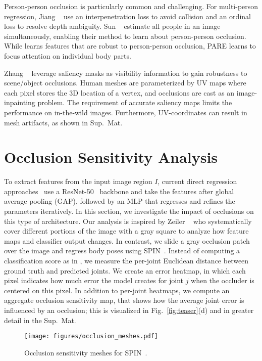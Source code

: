\documentclass[10pt,twocolumn,letterpaper,usenames,dvipsnames]{article}
\newcommand{\methodname}{PARE\xspace}
\newcommand{\figref}[1]{Fig.~\ref{#1}}
\newcommand{\supmat}{Sup.~Mat.\xspace}
\begin{document}
Person-person occlusion is particularly common and challenging. 
For multi-person regression, Jiang \etal~\cite{jiang2020mpshape} use an interpenetration loss to avoid collision and an ordinal loss to resolve depth ambiguity. 
Sun \etal~\cite{CenterHMR} estimate all people in an image simultaneously, enabling their method to learn about person-person occlusion.
While \cite{CenterHMR} learns features that are robust to person-person occlusion, {\methodname} learns to focus attention on individual body parts.

Zhang \etal~\cite{zhangoohcvpr20} leverage saliency masks as visibility information to gain robustness to scene/object occlusions. 
Human meshes are parameterized by UV maps where each pixel stores the 3D location of a vertex, and occlusions are cast as an image-inpainting problem.
The requirement of accurate saliency maps limits the performance on in-the-wild images. Furthermore, UV-coordinates can result in mesh artifacts, as shown in \supmat
 	\section{Occlusion Sensitivity Analysis}
\label{sec:occlusion_analysis}
To extract features from the input image region $I$, current direct regression approaches~\cite{kanazawa_hmr,SPIN:ICCV:2019} use a ResNet-50~\cite{he2016resnet} backbone and take the features after global average pooling (GAP), followed by an MLP that regresses and refines the parameters iteratively. 
In this section, we investigate the impact of occlusions on this type of architecture. Our analysis is inspired by  Zeiler \etal~\cite{zeiler2014visualizing} who systematically cover different portions of the image with a gray square to analyze how feature maps and classifier output changes. 
In contrast, we slide a gray occlusion patch over the image and regress body poses using SPIN~\cite{SPIN:ICCV:2019}.
Instead of computing a classification score as in \cite{zeiler2014visualizing}, we measure the per-joint Euclidean distance between ground truth and predicted joints. 
We create an error heatmap, in which each pixel indicates how much error the model creates for joint $j$ when the occluder is centered on this pixel.
In addition to per-joint heatmaps, we compute an aggregate occlusion sensitivity map, that shows how the average joint error is influenced by an occlusion; this is visualized in \figref{fig:teaser}(d) and in greater detail in the \supmat

\begin{figure}
	\centering
	\texttt{[image: figures/occlusion\_meshes.pdf]}
	\caption{Occlusion sensitivity meshes for SPIN~\cite{SPIN:ICCV:2019}. }
	\label{fig:occ_meshes}
	\vspace{-2ex}
\end{figure}{}
\end{document}
